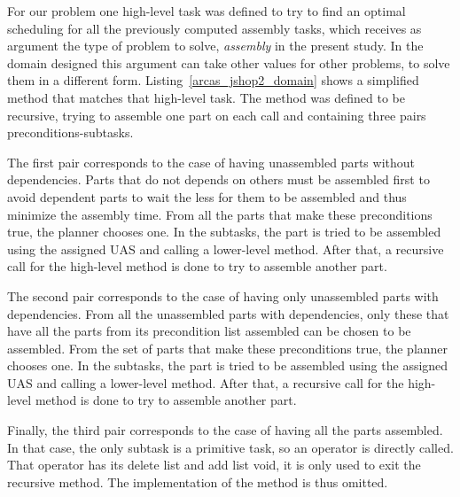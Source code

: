 \documentclass[letterpaper, 12pt, conference]{ieeeconf}    %
\begin{document}
For our problem one high-level task was defined to try to find an optimal scheduling for all the previously computed assembly tasks, which receives as argument the type of problem to solve, \textit{assembly} in the present study. In the domain designed this argument can take other values for other problems, to solve them in a different form. Listing~\ref{arcas_jshop2_domain} shows a simplified method that matches that high-level task. The method was defined to be recursive, trying to assemble one part on each call and containing three pairs preconditions-subtasks.

The first pair corresponds to the case of having unassembled parts without dependencies. Parts that do not depends on others must be assembled first to avoid dependent parts to wait the less for them to be assembled and thus minimize the assembly time. From all the parts that make these preconditions true, the planner chooses one. In the subtasks, the part is tried to be assembled using the assigned UAS and calling a lower-level method. After that, a recursive call for the high-level method is done to try to assemble another part.

The second pair corresponds to the case of having only unassembled parts with dependencies. From all the unassembled parts with dependencies, only these that have all the parts from its precondition list assembled can be chosen to be assembled. From the set of parts that make these preconditions true, the planner chooses one. In the subtasks, the part is tried to be assembled using the assigned UAS and calling a lower-level method. After that, a recursive call for the high-level method is done to try to assemble another part.

Finally, the third pair corresponds to the case of having all the parts assembled. In that case, the only subtask is a primitive task, so an operator is directly called. That operator has its delete list and add list void, it is only used to exit the recursive method. The implementation of the method is thus omitted.


\end{document}
